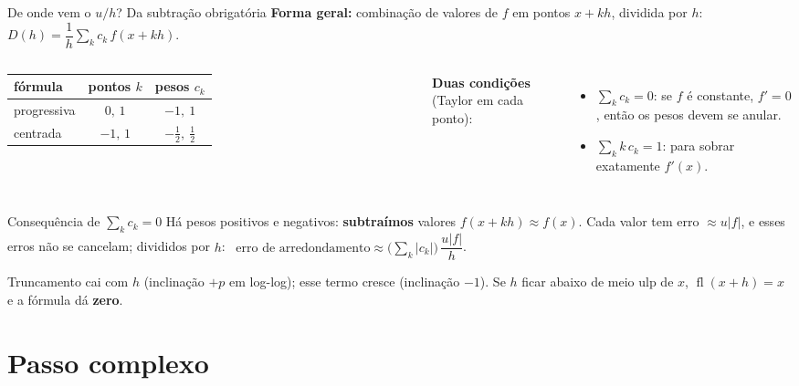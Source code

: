 \documentclass[aspectratio=169,11pt]{beamer}
\newcommand{\fl}{\operatorname{fl}}
\begin{document}
\begin{frame}{De onde vem o $u/h$? Da subtração obrigatória}
  \small
  \textbf{Forma geral:} combinação de valores de $f$ em pontos $x+kh$, dividida por $h$: \quad $D(h) = \dfrac1h\displaystyle\sum_k c_k\,f(x+kh)$.
  \vspace{0.3em}
  \begin{columns}[T]
    \renewcommand{\arraystretch}{1.15}
    \begin{tabular}{lcc}
      \toprule
      fórmula & pontos $k$ & pesos $c_k$ \\
      \midrule
      progressiva & $0,\,1$ & $-1,\ 1$ \\
      centrada & $-1,\,1$ & $-\tfrac12,\ \tfrac12$ \\
      \bottomrule
    \end{tabular}
    \textbf{Duas condições} (Taylor em cada ponto):
    \begin{itemize}
      \item $\sum_k c_k = 0$: se $f$ é constante, $f'=0$, então os pesos devem se anular.
      \item $\sum_k k\,c_k = 1$: para sobrar exatamente $f'(x)$.
    \end{itemize}
  \end{columns}
  \vspace{0.3em}
  \begin{alertblock}{Consequência de $\sum_k c_k = 0$}
    Há pesos positivos e negativos: \textbf{subtraímos} valores $f(x+kh)\approx f(x)$. Cada valor tem erro $\approx u|f|$, e esses erros não se cancelam; divididos por $h$:
    \ $\text{erro de arredondamento}\approx \big(\textstyle\sum_k|c_k|\big)\,\dfrac{u|f|}{h}$.
  \end{alertblock}
  {\footnotesize Truncamento cai com $h$ (inclinação $+p$ em log-log); esse termo cresce (inclinação $-1$). Se $h$ ficar abaixo de meio ulp de $x$, $\fl(x+h)=x$ e a fórmula dá \textbf{zero}.}
\end{frame}

\section{Passo complexo}
\end{document}
